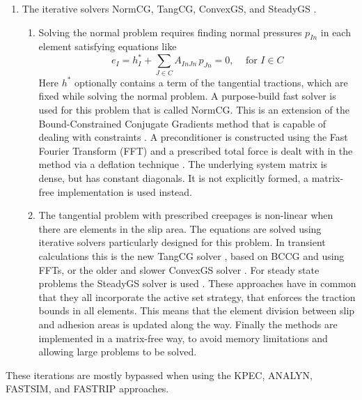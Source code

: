 \documentclass[12pt]{report}
\begin{document}
\begin{enumerate}
\item\label{itm:it_solvers} The iterative solvers NormCG, TangCG, 
        ConvexGS, and SteadyGS \cite{Vollebregt2014a-fftprec, 
        Zhao_Jing2015a-tangcg,Vollebregt1995a-convexgs,
        Vollebregt2010c-cst2010}.
\begin{enumerate}
\item Solving the normal problem requires finding normal pressures
        $p_{In}$ in each element satisfying equations like
        \begin{equation}
         e_I = h^*_I + \sum_{J\in C} A_{InJn} \, p_{Jn} = 0,
                                        \;\;\;\mbox{ for } I\in C
        \end{equation}
        Here $h^*$ optionally contains a term of the tangential tractions,
        which are fixed while solving the normal problem. A purpose-build
        fast solver is used for this problem that is called NormCG.
        This is an extension of the Bound-Constrained Conjugate Gradients
        method that is capable of dealing with constraints
        \cite{Vollebregt2014b-bccg}. A preconditioner is constructed using
        the Fast Fourier Transform (FFT) and a prescribed total force is
        dealt with in the method via a deflation technique
        \cite{Vollebregt2014a-fftprec}.
        The underlying system matrix is dense, but has constant diagonals. It
        is not explicitly formed, a matrix-free implementation is used
        instead.
\item The tangential problem with prescribed creepages is non-linear when
        there are elements in the slip area. The equations are solved using
        iterative solvers particularly designed for this problem. In
        transient calculations this is the new TangCG solver
        \cite{Zhao_Jing2015a-tangcg}, based on BCCG and using FFTs, or the
        older and slower ConvexGS solver \cite{Vollebregt1995a-convexgs}.
        For steady state problems the SteadyGS solver is used 
        \cite{Vollebregt2010c-cst2010}. These approaches have in common
        that they all incorporate the active set strategy, that enforces
        the traction bounds in all elements. This means that the element
        division between slip and adhesion areas is updated along the way.
        Finally the methods are implemented in a matrix-free way, to avoid
        memory limitations and allowing large problems to be solved.
\end{enumerate}

\end{enumerate}
These iterations are mostly bypassed when using the KPEC, ANALYN,
FASTSIM, and FASTRIP approaches. 
\end{document}
